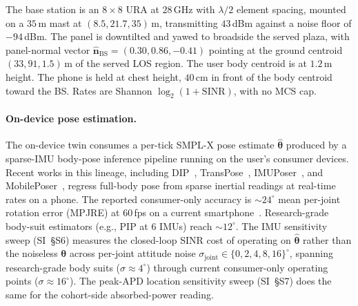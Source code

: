 \documentclass[journal,twocolumn,10pt]{IEEEtran}
\theoremstyle{plain}
\theoremstyle{definition}
\theoremstyle{remark}
\begin{document}
The base station is an $8\times 8$ URA at $28\,$GHz with
$\lambda/2$ element spacing, mounted on a $35\,$m mast at
$(8.5, 21.7, 35)\,$m, transmitting $43\,$dBm against a noise
floor of $-94\,$dBm. The panel is downtilted and yawed to
broadside the served plaza, with panel-normal vector
$\hat{\bm{n}}_\mathrm{BS} = (0.30, 0.86, -0.41)$ pointing at the
ground centroid $(33, 91, 1.5)\,$m of the served LOS region. The
user body centroid is at $1.2\,$m height. The phone is held at
chest height, $40\,$cm in front of the body centroid toward the
BS. Rates are Shannon $\log_2(1 + \mathrm{SINR})$, with no MCS
cap.

\paragraph*{On-device pose estimation.} The on-device twin
consumes a per-tick SMPL-X pose estimate $\hat{\bm{\theta}}$
produced by a sparse-IMU body-pose inference pipeline running
on the user's consumer devices. Recent works in this lineage,
including DIP~\cite{DIP2018}, TransPose~\cite{TransPose2021},
IMUPoser~\cite{Mollyn2023IMUPoser}, and
MobilePoser~\cite{Xu2024MobilePoser}, regress full-body pose from
sparse inertial readings at real-time rates on a phone. The
reported consumer-only accuracy is ${\sim}24^{\circ}$ mean
per-joint rotation error (MPJRE) at $60\,$fps on a current
smartphone~\cite{Xu2024MobilePoser}. Research-grade body-suit
estimators (e.g., PIP at $6$ IMUs) reach ${\sim}12^{\circ}$. The
IMU sensitivity sweep (SI~\S{}S6) measures the closed-loop SINR
cost of operating on $\hat{\bm{\theta}}$ rather than the
noiseless $\bm{\theta}$ across per-joint attitude noise
$\sigma_\mathrm{joint} \in \{0, 2, 4, 8, 16\}^{\circ}$, spanning
research-grade body suits ($\sigma \approx 4^{\circ}$) through
current consumer-only operating points
($\sigma \approx 16^{\circ}$). The peak-APD location sensitivity
sweep (SI~\S{}S7) does the same for the cohort-side absorbed-power
reading.
\end{document}
